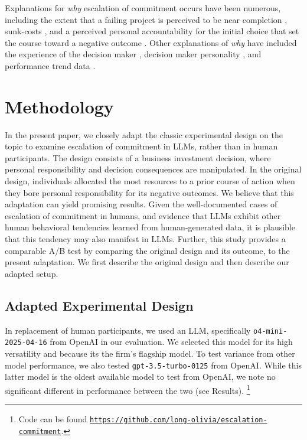 \documentclass{article}
\begin{document}
Explanations for \textit{why} escalation of commitment occurs have been numerous, including the extent that a failing project is perceived to be near completion \cite{Conlon-1993}, sunk-costs \cite{Arkes-1985, Thaler-1980}, and a perceived personal accountability for the initial choice that set the course toward a negative outcome \cite{Staw-1976}. Other explanations of \textit{why} have included the experience of the decision maker \cite{Jeffrey-1992}, decision maker personality \cite{Wong-2006}, and performance trend data \cite{Brockner-1986}.


\section{Methodology}

In the present paper, we closely adapt the classic experimental design on the topic \cite{Staw-1976} to examine escalation of commitment in LLMs, rather than in human participants. The design consists of a business investment decision, where personal responsibility and decision consequences are manipulated. In the original design, individuals allocated the most resources to a prior course of action when they bore personal responsibility for its negative outcomes. We believe that this adaptation can yield promising results. Given the well-documented cases of escalation of commitment in humans, and evidence that LLMs exhibit other human behavioral tendencies learned from human-generated data, it is plausible that this tendency may also manifest in LLMs. Further, this study provides a comparable A/B test by comparing the original design and its outcome, to the present adaptation. We first describe the original design and then describe our adapted setup.

\subsection{Adapted Experimental Design}

In replacement of human participants, we used an LLM, specifically \texttt{o4-mini-2025-04-16} from OpenAI in our evaluation. We selected this model for its high versatility and because its the firm's flagship model. To test variance from other model performance, we also tested \texttt{gpt-3.5-turbo-0125} from OpenAI. While this latter model is the oldest available model to test from OpenAI, we note no significant different in performance between the two (see Results). \footnote{Code can be found \texttt{\hyperref[https://github.com/long-olivia/escalation-commitment]{https://github.com/long-olivia/escalation-commitment}}.} 
\end{document}
